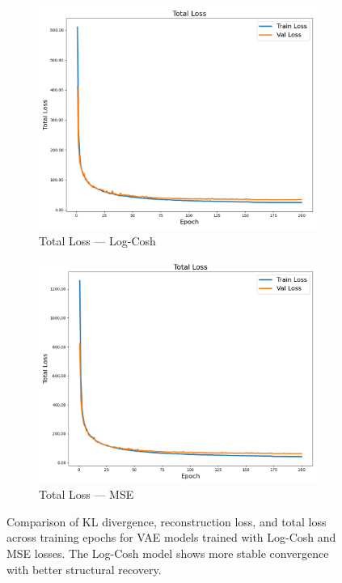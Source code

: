 \begin{figure}[p]
    \begin{subfigure}[b]{0.48\textwidth}
        \includegraphics[width=\textwidth]{img/vae_results/200_epochs_128_ls_logcosh/logcosh_total_loss.png}
        \caption{Total Loss — Log-Cosh}
    \end{subfigure}
    \hfill
    \begin{subfigure}[b]{0.48\textwidth}
        \includegraphics[width=\textwidth]{img/vae_results/200_epochs_128_ls_mse/mse_total_loss.png}
        \caption{Total Loss — MSE}
    \end{subfigure}

    \caption[Loss comparison for Log-Cosh and MSE-trained VAEs]{%
Comparison of KL divergence, reconstruction loss, and total loss across training epochs for VAE models trained with Log-Cosh and MSE losses. The Log-Cosh model shows more stable convergence with better structural recovery.}
    \label{fig:vae_loss_comparison_1}
\end{figure}



